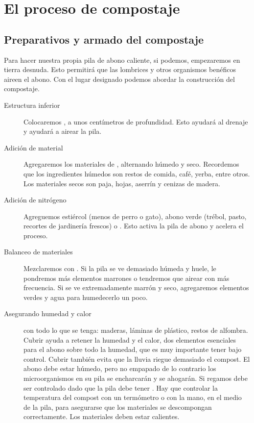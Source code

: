 \documentclass[../main.tex]{subfiles}
\begin{document}
\section{El proceso de compostaje}

\subsection{Preparativos y armado del compostaje}

Para hacer nuestra propia pila de abono caliente, si podemos, empezaremos en tierra desnuda. Esto permitirá que las lombrices y otros organismos benéficos aireen el abono. Con el lugar designado podemos abordar la construcción del compostaje.\\

\begin{description}
    \item [Estructura inferior] 
    Colocaremos , a unos centímetros de profundidad. Esto ayudará al drenaje y ayudará a airear la pila.\\[-5pt]
    \item [Adición de material] 
    Agregaremos los materiales de , alternando húmedo y seco. Recordemos que los ingredientes húmedos son restos de comida, café, yerba, entre otros. Los materiales secos son paja, hojas, aserrín y cenizas de madera.\\[-5pt]
    \item [Adición de nitrógeno] 
    Agreguemos estiércol (menos de perro o gato), abono verde (trébol, pasto, recortes de jardinería frescos) o . Esto activa la pila de abono y acelera el proceso.\\[-5pt]
    \item [Balanceo de materiales] 
    Mezclaremos  con . Si la pila se ve demasiado húmeda y huele, le pondremos más elementos marrones o tendremos que airear con más frecuencia. Si se ve extremadamente marrón y seco, agregaremos elementos verdes y agua para humedecerlo un poco.\\[-5pt]
    \item [Asegurando humedad y calor] 
     con todo lo que se tenga: maderas, láminas de plástico, restos de alfombra. Cubrir ayuda a retener la humedad y el calor, dos elementos esenciales para el abono sobre todo la humedad, que es muy importante tener bajo control. Cubrir también evita que la lluvia riegue demasiado el compost. El abono debe estar húmedo, pero no empapado de lo contrario los microorganismos en su pila se encharcarán y se ahogarán. Si regamos debe ser controlado dado que la  pila debe tener . Hay que controlar la temperatura del compost con un termómetro o con la mano, en el medio de la pila, para asegurarse que los materiales se descompongan correctamente. Los materiales deben estar calientes.\\[-5pt]
\end{description}
\end{document}
